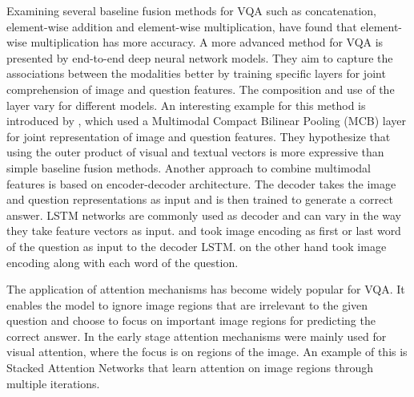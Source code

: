 \documentclass{article}
\begin{document}
Examining several baseline fusion methods for VQA such as concatenation, element-wise addition and element-wise multiplication, \citet{malinowski2017ask} have found that element-wise multiplication has more accuracy. A more advanced method for VQA is presented by end-to-end deep neural network models. They aim to capture the associations between the modalities better by training specific layers for joint comprehension of image and question features. The composition and use of the layer vary for different models. An interesting example for this method is introduced by \citet{fukui2016multimodal}, which used a Multimodal Compact Bilinear Pooling (MCB) layer for joint representation of image and question features. They hypothesize that using the outer product of visual and textual vectors is more expressive than simple baseline fusion methods. Another approach to combine multimodal features is based on encoder-decoder architecture. The decoder takes the image and question representations as input and is then trained to generate a correct answer. LSTM networks are commonly used as decoder and can vary in the way they take feature vectors as input. \citet{ren2015exploring} and \citet{zhu2016cvpr} took image encoding as first or last word of the question as input to the decoder LSTM. \citet{malinowski2017ask} on the other hand took image encoding along with each word of the question.

The application of attention mechanisms has become widely popular for VQA. It enables the model to ignore image regions that are irrelevant to the given question and choose to focus on important image regions for predicting the correct answer. In the early stage attention mechanisms were mainly used for visual attention, where the focus is on regions of the image. An example of this is Stacked Attention Networks \citep{yang2016vqa} that learn attention on image regions through multiple iterations.
\end{document}
